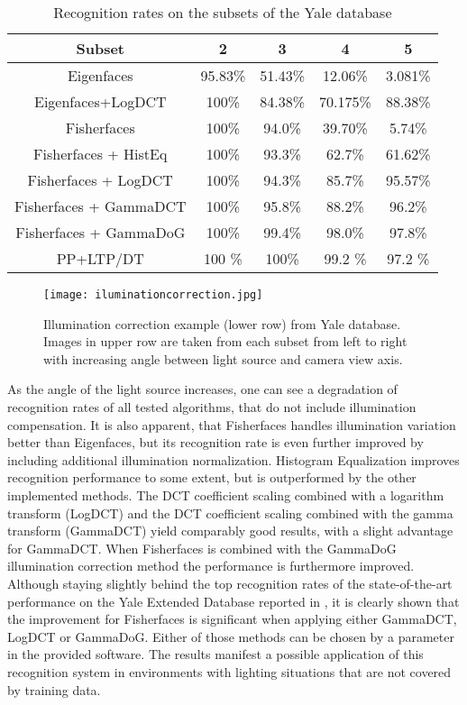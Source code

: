 \begin{table}[htb]
\caption{Recognition rates on the subsets of the Yale database}
\label{tab:recognitionYale}
\begin{center}
\begin{tabular}{c|c|c|c|c}
Subset &  2 & 3 & 4 & 5 \\
\hline
Eigenfaces& 95.83\% &51.43\% &12.06\% &3.081\% \\
Eigenfaces+LogDCT&100\% &84.38\% &70.175\% & 88.38\% \\ 
Fisherfaces& 100\% &94.0\% &39.70\%&5.74\%\\ 
Fisherfaces + HistEq &  100\% & 93.3\% & 62.7\% & 61.62\% \\ 
Fisherfaces + LogDCT & 100\% &94.3\% &85.7\% & 95.57\%\\
Fisherfaces + GammaDCT & 100\% &95.8\% &88.2\% & 96.2\%\\
Fisherfaces + GammaDoG & 100\% &99.4\% &98.0\% & 97.8\%\\
\hline
PP+LTP/DT \cite{Tan2010} & 100 \% & 100\% & 99.2 \% & 97.2 \% \\
\end{tabular}
\end{center}
\end{table}

\begin{figure}[t]
	\begin{center}
		\texttt{[image: iluminationcorrection.jpg]}
	\end{center}
	\caption{Illumination correction example (lower row) from Yale database. Images in upper row are taken from each subset from left to right with increasing angle between light source and camera view axis.}
	\label{fig:illuminationcorrection}
\end{figure}
As the angle of the light source increases, one can see a degradation of recognition rates of all tested algorithms, that do not include illumination compensation.
It is also apparent, that Fisherfaces handles illumination variation better than Eigenfaces, but its recognition rate is even further improved by including additional illumination normalization.  
Histogram Equalization improves recognition performance to some extent, but is outperformed by the other implemented methods.
The DCT coefficient scaling combined with a logarithm transform (LogDCT) and the DCT coefficient scaling combined with the gamma transform (GammaDCT) yield comparably good results, with a slight advantage for GammaDCT.
When Fisherfaces is combined with the GammaDoG illumination correction method the performance is furthermore improved.
Although staying slightly behind the top recognition rates of the state-of-the-art performance on the Yale Extended Database reported in \cite{Tan2010}, it is clearly shown that the improvement for Fisherfaces is significant when applying either GammaDCT, LogDCT or GammaDoG. Either of those methods can be chosen by a parameter in the provided software.
The results manifest a possible application of this recognition system in environments with lighting situations that are not covered by training data.


